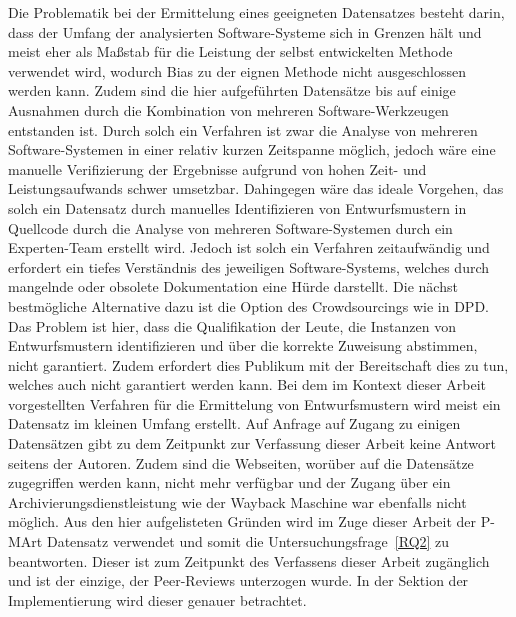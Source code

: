 Die Problematik bei der Ermittelung eines geeigneten Datensatzes besteht darin, dass der Umfang der analysierten Software-Systeme sich in Grenzen hält und meist eher als Maßstab für die Leistung der selbst entwickelten Methode verwendet wird, wodurch Bias zu der eignen Methode nicht ausgeschlossen werden kann.
Zudem sind die hier aufgeführten Datensätze bis auf einige Ausnahmen durch die Kombination von mehreren Software-Werkzeugen entstanden ist. Durch solch ein Verfahren ist zwar die Analyse von mehreren Software-Systemen in einer relativ kurzen Zeitspanne möglich, jedoch wäre eine manuelle Verifizierung der Ergebnisse aufgrund von hohen Zeit- und Leistungsaufwands schwer umsetzbar.
Dahingegen wäre das ideale Vorgehen, das solch ein Datensatz durch manuelles Identifizieren von Entwurfsmustern in Quellcode durch die Analyse von mehreren Software-Systemen durch ein Experten-Team erstellt wird. Jedoch ist solch ein Verfahren zeitaufwändig und erfordert ein tiefes Verständnis des jeweiligen Software-Systems, welches durch mangelnde oder obsolete Dokumentation eine Hürde darstellt.
Die nächst bestmögliche Alternative dazu ist die Option des Crowdsourcings wie in DPD. Das Problem ist hier, dass die Qualifikation der Leute, die Instanzen von Entwurfsmustern identifizieren und über die korrekte Zuweisung abstimmen, nicht garantiert. Zudem erfordert dies Publikum mit der Bereitschaft dies zu tun, welches auch nicht garantiert werden kann.
Bei dem im Kontext dieser Arbeit vorgestellten Verfahren für die Ermittelung von Entwurfsmustern wird meist ein Datensatz im kleinen Umfang erstellt. Auf Anfrage auf Zugang zu einigen Datensätzen gibt zu dem Zeitpunkt zur Verfassung dieser Arbeit keine Antwort seitens der Autoren. Zudem sind die Webseiten, worüber auf die Datensätze zugegriffen werden kann, nicht mehr verfügbar und der Zugang über ein Archivierungsdienstleistung wie der Wayback Maschine war ebenfalls nicht möglich. 
Aus den hier aufgelisteten Gründen wird im Zuge dieser Arbeit der P-MArt Datensatz verwendet und somit die Untersuchungsfrage~\ref{RQ2} zu beantworten. Dieser ist zum Zeitpunkt des Verfassens dieser Arbeit zugänglich und ist der einzige, der Peer-Reviews unterzogen wurde. In der Sektion der Implementierung wird dieser genauer betrachtet.
